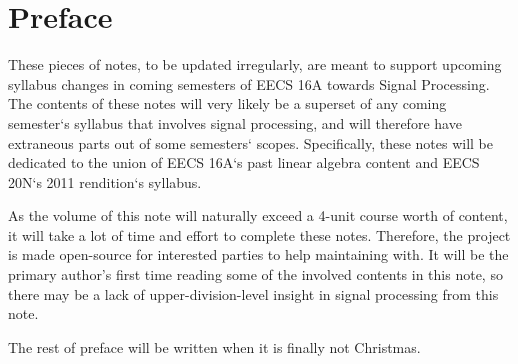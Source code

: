 \section{Preface}
These pieces of notes, to be updated irregularly, are meant to support upcoming syllabus changes in coming semesters of EECS 16A towards Signal Processing.
The contents of these notes will very likely be a superset of any coming semester`s syllabus that involves signal processing, and will therefore have extraneous parts out of some semesters` scopes.
Specifically, these notes will be dedicated to the union of EECS 16A`s past linear algebra content and EECS 20N`s 2011 rendition`s syllabus.

As the volume of this note will naturally exceed a 4-unit course worth of content, it will take a lot of time and effort to complete these notes. Therefore, the project is made open-source for interested parties to help maintaining with.
It will be the primary author's first time reading some of the involved contents in this note, so there may be a lack of upper-division-level insight in signal processing from this note.

The rest of preface will be written when it is finally not Christmas.
